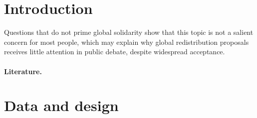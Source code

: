 \documentclass[12pt,english]{article}
\begin{document}

\clearpage
\tableofcontents

\onehalfspacing %

\begin{bibunit}


\section{Introduction}\label{sec:intro}%

Questions that do not prime global solidarity show that this topic is not a salient concern for most people, which may explain why global redistribution proposals receives little attention in public debate, despite widespread acceptance. 



\paragraph{Literature.} 

\section{Data and design\label{sec:data}}


\end{bibunit}
\end{document}
